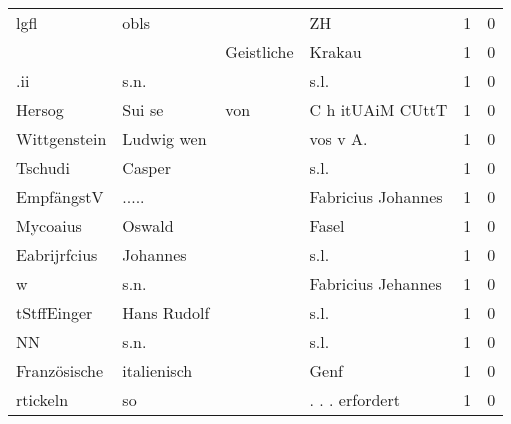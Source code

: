 \documentclass[10pt,a4paper,landscape]{article}
\begin{document}
\begin{longtable}{llllrr}
                     lgfl &                               obls &             &                                          ZH &          1 &         0 \\
                          &                                    &  Geistliche &                                      Krakau &          1 &         0 \\
                      .ii &                               s.n. &             &                                        s.l. &          1 &         0 \\
                   Hersog &                             Sui se &         von &                            C h itUAiM CUttT &          1 &         0 \\
             Wittgenstein &                         Ludwig wen &             &                                   vos v A.  &          1 &         0 \\
                  Tschudi &                             Casper &             &                                        s.l. &          1 &         0 \\
               EmpfängstV &                              ..... &             &                          Fabricius Johannes &          1 &         0 \\
                 Mycoaius &                             Oswald &             &                                       Fasel &          1 &         0 \\
             Eabrijrfcius &                           Johannes &             &                                        s.l. &          1 &         0 \\
                        w &                               s.n. &             &                          Fabricius Jehannes &          1 &         0 \\
              tStffEinger &                        Hans Rudolf &             &                                        s.l. &          1 &         0 \\
                       NN &                               s.n. &             &                                        s.l. &          1 &         0 \\
             Französische &                        italienisch &             &                                        Genf &          1 &         0 \\
                 rtickeln &                                 so &             &                             . . . erfordert &          1 &         0 \\

\end{longtable}
\end{document}

